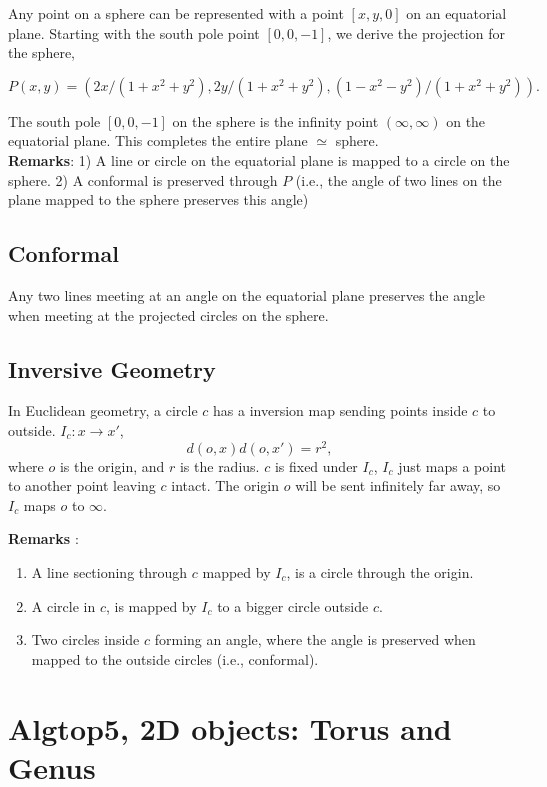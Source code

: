 \documentclass[12pt]{article}
\begin{document}
Any point on a sphere can be represented with a point $[x,y,0]$ on an equatorial plane. 
Starting with the south pole point $[0,0,-1]$, we derive the projection for the sphere,

\begin{equation}
   P(x,y) = (2x/(1+x^2+y^2), 2y/(1+x^2+y^2), (1-x^2-y^2)/(1+x^2+y^2)).
\end{equation}

The south pole $[0,0,-1]$ on the sphere is the infinity point $(\infty,\infty)$ on the equatorial plane. 
This completes the entire plane $\simeq$ sphere. \\

{\bf Remarks}: 1) A line or circle on the equatorial plane is mapped to a circle on the sphere.
2) A conformal is preserved through $P$ (i.e., the angle of two lines on the plane mapped to the sphere preserves this angle)

\subsection{Conformal}
Any two lines meeting at an angle on the equatorial plane preserves the angle when meeting at the projected circles on the sphere.

\subsection{Inversive Geometry}
In Euclidean geometry, a circle $c$ has a inversion map sending points inside $c$ to outside.
$I_c: x \longrightarrow x'$, 
\begin{equation}
   d(o,x)d(o,x')=r^2,
\end{equation}
where $o$ is the origin, and $r$ is the radius.
$c$ is fixed under $I_c$, $I_c$ just maps a point to another point leaving $c$ intact.
The origin $o$ will be sent infinitely far away, so $I_c$ maps $o$ to $\infty$.

{\bf Remarks }: 
\begin{enumerate} 
   \item A line sectioning through $c$ mapped by $I_c$, is a circle through the origin.
   \item A circle in $c$, is mapped by $I_c$ to a bigger circle outside $c$. 
   \item Two circles inside $c$ forming an angle, where the angle is preserved when mapped to the outside circles (i.e., conformal).
\end{enumerate}

\section{Algtop5, 2D objects: Torus and Genus}
\end{document}
